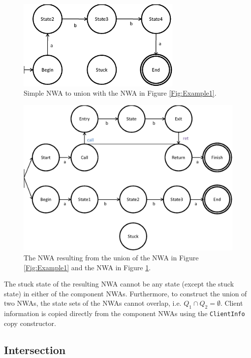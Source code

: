 \documentclass{llncs}
\begin{document}
\begin{figure}[htbp]
  \centering
    \includegraphics[width=8cm]{Figures/Figure3.eps}
  \caption{Simple NWA to union with the NWA in Figure \ref{Fig:Example1}.}
  \label{Fig:Union1}
\end{figure}

\begin{figure}[htbp]
  \centering
    \includegraphics[width=12cm]{Figures/Figure4.eps}
  \caption{The NWA resulting from the union of the NWA in Figure \ref{Fig:Example1} and the NWA in Figure \ref{Fig:Union1}.}
  \label{Fig:Union2}
\end{figure}

The stuck state of the resulting NWA cannot be any state (except the stuck state) in either of the component NWAs.  Furthermore, to construct the union of two NWAs, the state sets of the NWAs cannot overlap, i.e. $Q_1 \cap Q_2 = \emptyset$. Client information is copied directly from the component NWAs using the \texttt{ClientInfo} copy constructor.

\subsection{Intersection}
\label{Se:Intersection}
\end{document}
